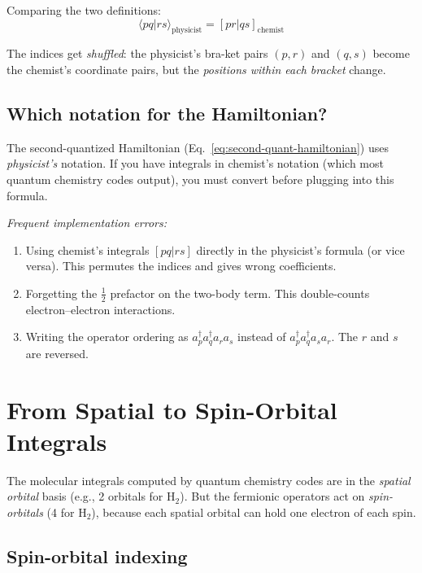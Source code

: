 \documentclass[aps,prb,preprint,longbibliography,nofootinbib]{revtex4-2}
\begin{document}
Comparing the two definitions:
\begin{equation}
\boxed{\langle pq|rs\rangle_\text{physicist} = [pr|qs]_\text{chemist}}
\label{eq:conversion}
\end{equation}

The indices get \emph{shuffled}: the physicist's bra-ket pairs $(p, r)$
and $(q, s)$ become the chemist's coordinate pairs, but the
\emph{positions within each bracket} change.

\subsection{Which notation for the Hamiltonian?}

The second-quantized Hamiltonian (Eq.~\ref{eq:second-quant-hamiltonian})
uses \emph{physicist's} notation.  If you have integrals in chemist's
notation (which most quantum chemistry codes output), you must convert
before plugging into this formula.

\emph{Frequent implementation errors:}
\begin{enumerate}
\item Using chemist's integrals $[pq|rs]$ directly in the physicist's
  formula (or vice versa).  This permutes the indices and gives wrong
  coefficients.
\item Forgetting the $\frac{1}{2}$ prefactor on the two-body term.
  This double-counts electron--electron interactions.
\item Writing the operator ordering as
  $a^\dagger_p a^\dagger_q a_r a_s$ instead of
  $a^\dagger_p a^\dagger_q a_s a_r$.  The $r$ and $s$ are reversed.
\end{enumerate}

\section{From Spatial to Spin-Orbital Integrals}
\label{sec:spin-orbitals}

The molecular integrals computed by quantum chemistry codes are in the
\emph{spatial orbital} basis (e.g., 2 orbitals for H$_2$).  But the
fermionic operators act on \emph{spin-orbitals} (4 for H$_2$), because
each spatial orbital can hold one electron of each spin.

\subsection{Spin-orbital indexing}
\end{document}
